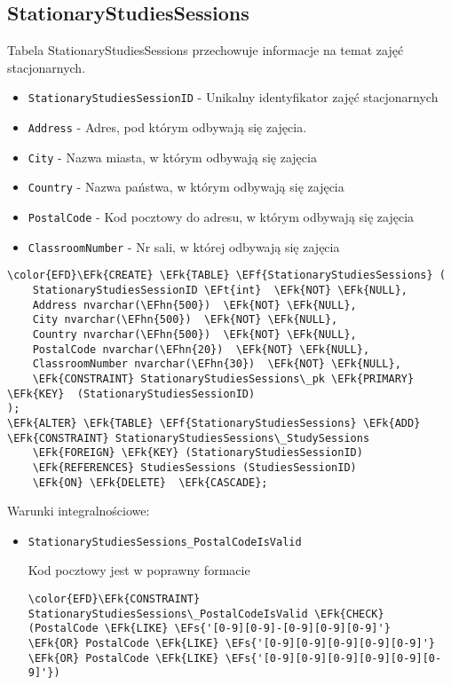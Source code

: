 \documentclass[11pt]{article}
\newcommand{\EFs}[1]{\textcolor{EFs}{#1}} %
\newcommand{\EFk}[1]{\textcolor{EFk}{\textbf{#1}}} %
\newcommand{\EFf}[1]{\textcolor{EFf}{#1}} %
\newcommand{\EFt}[1]{\textcolor{EFt}{\textbf{#1}}} %
\newcommand{\EFhn}[1]{\textcolor{EFhn}{#1}} %
\begin{document}
\subsection{StationaryStudiesSessions}
\label{sec:orgeb6166d}
Tabela StationaryStudiesSessions przechowuje informacje na temat zajęć stacjonarnych.
\begin{itemize}
\item \texttt{StationaryStudiesSessionID} - Unikalny identyfikator zajęć stacjonarnych
\item \texttt{Address} - Adres, pod którym odbywają się zajęcia.
\item \texttt{City} - Nazwa miasta, w którym odbywają się zajęcia
\item \texttt{Country} - Nazwa państwa, w którym odbywają się zajęcia
\item \texttt{PostalCode} - Kod pocztowy do adresu, w którym odbywają się zajęcia
\item \texttt{ClassroomNumber} - Nr sali, w której odbywają się zajęcia
\end{itemize}
\begin{Code}
\begin{Verbatim}
\color{EFD}\EFk{CREATE} \EFk{TABLE} \EFf{StationaryStudiesSessions} (
    StationaryStudiesSessionID \EFt{int}  \EFk{NOT} \EFk{NULL},
    Address nvarchar(\EFhn{500})  \EFk{NOT} \EFk{NULL},
    City nvarchar(\EFhn{500})  \EFk{NOT} \EFk{NULL},
    Country nvarchar(\EFhn{500})  \EFk{NOT} \EFk{NULL},
    PostalCode nvarchar(\EFhn{20})  \EFk{NOT} \EFk{NULL},
    ClassroomNumber nvarchar(\EFhn{30})  \EFk{NOT} \EFk{NULL},
    \EFk{CONSTRAINT} StationaryStudiesSessions\_pk \EFk{PRIMARY} \EFk{KEY}  (StationaryStudiesSessionID)
);
\EFk{ALTER} \EFk{TABLE} \EFf{StationaryStudiesSessions} \EFk{ADD} \EFk{CONSTRAINT} StationaryStudiesSessions\_StudySessions
    \EFk{FOREIGN} \EFk{KEY} (StationaryStudiesSessionID)
    \EFk{REFERENCES} StudiesSessions (StudiesSessionID)
    \EFk{ON} \EFk{DELETE}  \EFk{CASCADE};
\end{Verbatim}
\end{Code}
Warunki integralnościowe:


\begin{itemize}
\item \texttt{StationaryStudiesSessions\_PostalCodeIsValid}

Kod pocztowy jest w poprawny formacie
\begin{Code}
\begin{Verbatim}
\color{EFD}\EFk{CONSTRAINT} StationaryStudiesSessions\_PostalCodeIsValid \EFk{CHECK}
(PostalCode \EFk{LIKE} \EFs{'[0-9][0-9]-[0-9][0-9][0-9]'}
\EFk{OR} PostalCode \EFk{LIKE} \EFs{'[0-9][0-9][0-9][0-9][0-9]'}
\EFk{OR} PostalCode \EFk{LIKE} \EFs{'[0-9][0-9][0-9][0-9][0-9][0-9]'})
\end{Verbatim}
\end{Code}
\end{itemize}
\end{document}

